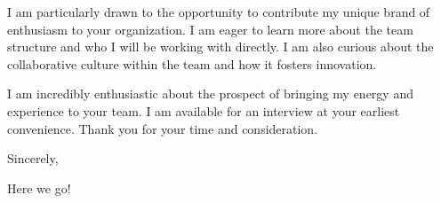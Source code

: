 \documentclass[letterpaper,11pt]{article}
\begin{document}
I am particularly drawn to the opportunity to contribute my unique brand of enthusiasm to your organization. I am eager to learn more about the team structure and who I will be working with directly. I am also curious about the collaborative culture within the team and how it fosters innovation.
\vspace{10pt}

I am incredibly enthusiastic about the prospect of bringing my energy and experience to your team. I am available for an interview at your earliest convenience. Thank you for your time and consideration.
\vspace{20pt}

Sincerely,

Here we go!

\end{document}
